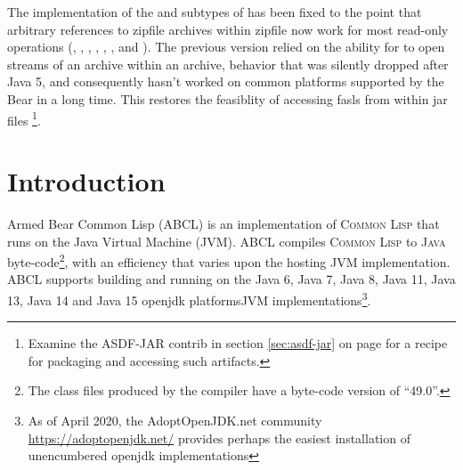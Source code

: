\documentclass[10pt]{book}
\begin{document}
The implementation of the  and
 subtypes of  has been fixed
to the point that arbitrary references to zipfile archives within
zipfile now work for most read-only operations (,
, , ,
, , and
).  The previous version relied on the
ability for  to open streams of an archive within
an archive, behavior that was silently dropped after Java 5, and
consequently hasn't worked on common platforms supported by the Bear
in a long time.  This restores the feasiblity of accessing fasls from
within jar files \footnote{Examine the ASDF-JAR contrib in section
\ref{sec:asdf-jar} on page \pageref{sec:asdf-jar} for a recipe for
packaging and accessing such artifacts.}.

\chapter{Introduction}

Armed Bear Common Lisp (\textsc{ABCL}) is an implementation of
\textsc{Common Lisp} that runs on the Java Virtual Machine
(\textsc{JVM}).  \textsc{ABCL} compiles \textsc{Common Lisp} to
\textsc{Java} byte-code\footnote{The class files produced by the
compiler have a byte-code version of ``49.0''.}, with an efficiency
that varies upon the hosting JVM implementation.  \textsc{ABCL}
supports building and running on the Java 6, Java 7, Java 8, Java 11,
Java 13, Java 14 and Java 15 openjdk platforms\textsc{JVM}
implementations\footnote{As of April 2020, the AdoptOpenJDK.net
community \url{https://adoptopenjdk.net/} provides perhaps the easiest
installation of unencumbered openjdk implementations}.
\end{document}
